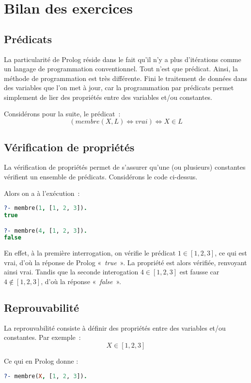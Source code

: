 \chapter{Bilan des exercices}

\section{Prédicats}

La particularité de Prolog réside dans le fait qu'il n'y a plus d'itérations comme
un langage de programmation conventionnel. Tout n'est que prédicat. Ainsi, la
méthode de programmation est très différente. Fini le traitement de données
dans des variables que l'on met à jour, car la programmation par prédicats permet
simplement de lier des propriétés entre des variables et/ou constantes.

Considérons pour la suite, le prédicat~:
\[(membre(X, L) \Leftrightarrow vrai) \Leftrightarrow X \in L\]


\section{Vérification de propriétés}

La vérification de propriétés permet de s'assurer qu'une (ou plusieurs) constantes
vérifient un ensemble de prédicats. Considérons le code ci-dessus.

Alors on a à l'exécution~:

\begin{lstlisting}[language=Prolog,frame=single]
?- membre(1, [1, 2, 3]).
true

?- membre(4, [1, 2, 3]).
false
\end{lstlisting}

En effet, à la première interrogation, on vérifie le prédicat $1 \in [1, 2, 3]$,
ce qui est vrai, d'où la réponse de Prolog «~\textit{true}~». La propriété est alors vérifiée, 
renvoyant ainsi vrai. Tandis que la seconde interogation $4 \in [1, 2, 3]$ est fausse car 
$4 \notin [1, 2, 3]$, d'où la réponse «~\textit{false}~».


\section{Reprouvabilité}

La reprouvabilité consiste à définir des propriétés entre des
variables et/ou constantes. Par exemple~:
\[
	X \in [1, 2, 3]
\]

 Ce qui en Prolog donne :
\begin{lstlisting}[language=Prolog,frame=single]
?- membre(X, [1, 2, 3]).
\end{lstlisting}


